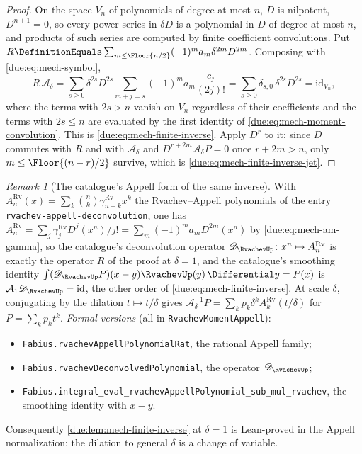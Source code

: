 \documentclass[11pt,oneside]{article}
\theoremstyle{plain}
\theoremstyle{definition}
\theoremstyle{remark}
\newtheorem{remark}[theorem]{Remark}
\newcommand{\am}[1]{a_{#1}}                                 %
\begin{document}
\begin{proof}
On the space \(V_n\) of polynomials of degree at most \(n\), \(D\) is
nilpotent, \(D^{n+1}=0\), so every power series in \(\delta D\) is a
polynomial in \(D\) of degree at most \(n\), and products of such series are
computed by finite coefficient convolutions.  Put
\(R\DefinitionEquals\sum_{m\le\Floor{n/2}}(-1)^{m}\am{m}\delta^{2m}D^{2m}\).
Composing with \cref{due:eq:mech-symbol},
\[
 R\,\mathcal A_\delta
 =\sum_{s\ge0}\delta^{2s}D^{2s}
 \sum_{m+j=s}(-1)^{m}\am{m}\frac{c_j}{(2j)!}
 =\sum_{s\ge0}\delta_{s,0}\,\delta^{2s}D^{2s}
 =\mathrm{id}_{V_n},
\]
where the terms with \(2s>n\) vanish on \(V_n\) regardless of their
coefficients and the terms with \(2s\le n\) are evaluated by the first
identity of \cref{due:eq:mech-moment-convolution}.  This is
\cref{due:eq:mech-finite-inverse}.  Apply \(D^{r}\) to it; since \(D\)
commutes with \(R\) and with \(\mathcal A_\delta\) and
\(D^{r+2m}\mathcal A_\delta P=0\) once \(r+2m>n\), only \(m\le\Floor{(n-r)/2}\)
survive, which is \cref{due:eq:mech-finite-inverse-jet}.
\end{proof}

\begin{remark}[The catalogue's Appell form of the same inverse]
\label{due:rmk:mech-appell}
With \(A_n^{\mathrm{Rv}}(x)=\sum_k\binom nk\gamma^{\mathrm{Rv}}_{n-k}x^{k}\) the
Rvachev--Appell polynomials of the entry
\texttt{rvachev-\allowbreak appell-\allowbreak deconvolution}, one has
\(A_n^{\mathrm{Rv}}=\sum_{j}\gamma^{\mathrm{Rv}}_j D^{j}(x^{n})/j!
=\sum_m(-1)^m\am{m}D^{2m}(x^{n})\) by
\cref{due:eq:mech-am-gamma}, so the catalogue's deconvolution operator
\(\mathscr D_{\RvachevUp}\colon x^{n}\mapsto A^{\mathrm{Rv}}_n\) is exactly the
operator \(R\) of the proof at \(\delta=1\), and the catalogue's smoothing
identity \(\int(\mathscr D_{\RvachevUp}P)(x-y)\RvachevUp(y)\,\Differential y=P(x)\)
is \(\mathcal A_1\mathscr D_{\RvachevUp}=\mathrm{id}\), the other order of
\cref{due:eq:mech-finite-inverse}.  At scale \(\delta\), conjugating by the
dilation \(t\mapsto t/\delta\) gives
\(\mathcal A_\delta^{-1}P=\sum_kp_k\delta^{k}A^{\mathrm{Rv}}_k(t/\delta)\)
for \(P=\sum_kp_kt^{k}\).  \emph{Formal versions} (all in \texttt{RvachevMomentAppell}):
\begin{itemize}
\item \texttt{Fabius.\allowbreak rvachevAppellPolynomialRat}, the rational Appell family;
\item \texttt{Fabius.\allowbreak rvachevDeconvolvedPolynomial}, the operator
\(\mathscr D_{\RvachevUp}\);
\item \texttt{Fabius.\allowbreak integral\_\allowbreak eval\_\allowbreak rvachevAppellPolynomial\_\allowbreak sub\_\allowbreak mul\_\allowbreak rvachev},
the smoothing identity with \(x-y\).
\end{itemize}
Consequently \cref{due:lem:mech-finite-inverse} at \(\delta=1\) is
Lean-proved in the Appell normalization; the dilation to general \(\delta\) is
a change of variable.
\end{remark}
\end{document}
